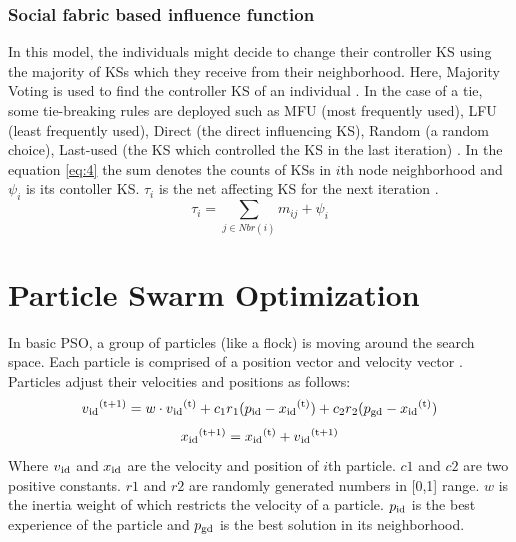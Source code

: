 \documentclass[letterpaper]{article}
\begin{document}
\subsubsection{Social fabric based influence function} In this model, the individuals might decide to change their controller KS using the majority of KSs which they receive from their neighborhood. Here, Majority Voting is used to find the controller KS of an individual \cite{che2010robust}. In the case of a tie, some tie-breaking rules are deployed such as MFU (most frequently used), LFU (least frequently used), Direct (the direct influencing KS), Random (a random choice), Last-used (the KS which controlled the KS in the last iteration) \cite{ali2012socio}. In the equation \ref{eq:4} the sum denotes the counts of KSs in $i$th node neighborhood and $\psi_{i}$ is its contoller KS. $\tau_{i}$ is the net affecting KS for the next iteration \cite{ali2016leveraged} \cite{sterling2004aggregation}. 
\begin{equation}
	\label{eq:4}
	\tau_{i}=\sum_{j \in Nbr(i)}m_{ij} + \psi_{i}
\end{equation}
\section{Particle Swarm Optimization}
In basic PSO, a group of particles (like a flock) is moving around the search space. Each particle is comprised of a position vector and velocity vector \cite{bratton2007defining}. Particles adjust their velocities and positions as follows:
\begin{equation}
	v\textsubscript{id}\textsuperscript{(t+1)}=w\cdot v\textsubscript{id}\textsuperscript{(t)} + c\textsubscript{1}r\textsubscript{1}(p\textsubscript{id}-x\textsubscript{id}\textsuperscript{(t)})+c\textsubscript{2}r\textsubscript{2}(p\textsubscript{gd}-x\textsubscript{id}\textsuperscript{(t)})
\end{equation}
\begin{equation}
	x\textsubscript{id}\textsuperscript{(t+1)}=x\textsubscript{id}\textsuperscript{(t)}+v\textsubscript{id}\textsuperscript{(t+1)}
\end{equation}
Where $v\textsubscript{id}$ and $x\textsubscript{id}$ are the velocity and position of $i$th particle. $c1$ and $c2$ are two positive constants. $r1$ and $r2$ are randomly generated numbers in [0,1] range. $w$ is the inertia weight of which restricts the velocity of a particle. $p\textsubscript{id}$ is the best experience of the particle and $p\textsubscript{gd}$ is the best solution in its neighborhood.
\end{document}
